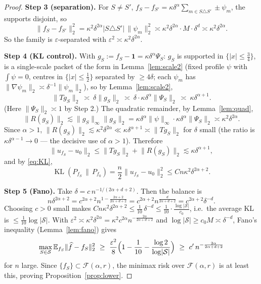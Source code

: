 \documentclass[11pt]{article}
\theoremstyle{remark}
\newcommand{\E}{\mathbb{E}}
\newcommand{\F}{\mathcal{F}}
\newcommand{\one}{\mathbf{1}}
\newcommand{\norm}[1]{\lVert #1\rVert}
\newcommand{\abs}[1]{\lvert #1\rvert}
\newcommand{\SET}[1]{\{#1\}}
\begin{document}
\begin{proof}
\textbf{Step 3 (separation).} For $S\ne S'$,
$f_S-f_{S'}=\kappa\delta^{\alpha}\sum_{m\in S\triangle S'}\pm\psi_m$, the
supports disjoint, so
\[
\norm{f_S-f_{S'}}_2^{2}
=\kappa^{2}\delta^{2\alpha}\abs{S\triangle S'}\,\norm{\psi_m}_2^{2}
\asymp\kappa^{2}\delta^{2\alpha}\cdot M\cdot\delta^{d}
\asymp\kappa^{2}\delta^{2\alpha}.
\]
So the family is $\varepsilon$-separated with
$\varepsilon^{2}\asymp\kappa^{2}\delta^{2\alpha}$.

\textbf{Step 4 (KL control).} With $g_S:=f_S-\one=\kappa\delta^{\alpha}\Psi_S$:
$g_S$ is supported in $\SET{\abs x\le\tfrac34}$, is a single-scale packet
of the form in Lemma~\ref{lem:scale2} (fixed profile $\psi$ with
$\int\psi=0$, centres in $\SET{\abs x\le\tfrac12}$ separated by
$\ge4\delta$; each $\psi_m$ has
$\norm{\nabla\psi_m}_2\asymp\delta^{-1}\norm{\psi_m}_2$), so by
Lemma~\ref{lem:scale2},
\[
\norm{Tg_S}_2\ \asymp\ \delta\norm{g_S}_2
\ \asymp\ \delta\cdot\kappa\delta^{\alpha}\norm{\Psi_S}_2
\ \asymp\ \kappa\delta^{\alpha+1}.
\]
(Here $\norm{\Psi_S}_2\asymp1$ by Step 2.) The quadratic remainder, by
Lemma~\ref{lem:quad},
\[
\norm{R(g_S)}_2\lesssim\norm{g_S}_\infty\norm{g_S}_2
=\kappa\delta^{\alpha}\norm{\psi}_\infty\cdot\kappa\delta^{\alpha}\norm{\Psi_S}_2
\asymp\kappa^{2}\delta^{2\alpha}.
\]
Since $\alpha>1$, $\norm{R(g_S)}_2\lesssim\kappa^{2}\delta^{2\alpha}
\ll\kappa\delta^{\alpha+1}\asymp\norm{Tg_S}_2$ for $\delta$ small (the
ratio is $\kappa\delta^{\alpha-1}\to0$ --- the decisive use of $\alpha>1$).
Therefore
\[
\norm{u_{f_S}-u_0}_2
\le\norm{Tg_S}_2+\norm{R(g_S)}_2
\lesssim\kappa\delta^{\alpha+1},
\]
and by \eqref{eq:KL},
\begin{equation}\label{eq:KLbound}
\operatorname{KL}(P_{f_S}\,\|\,P_{f_0})
=\frac{n}{2}\norm{u_{f_S}-u_0}_2^{2}
\le Cn\kappa^{2}\delta^{2\alpha+2}.
\end{equation}

\textbf{Step 5 (Fano).} Take
$\delta=c\,n^{-1/(2\alpha+d+2)}$. Then the balance is
\[
n\delta^{2\alpha+2}=c^{2\alpha+2}n^{1-\frac{2\alpha+2}{2\alpha+d+2}}
=c^{2\alpha+2}n^{\frac{d}{2\alpha+d+2}}
=c^{2\alpha+2}\delta^{-d}.
\]
Choosing $c>0$ small makes $Cn\kappa^{2}\delta^{2\alpha+2}
\le\frac1{10}\,\delta^{-d}\le\frac1{10}\cdot\frac{\log\abs{\mathcal S}}{c_0}$,
i.e.\ the average KL is $\le\frac1{10}\log\abs{\mathcal S}$. With
$\varepsilon^{2}\asymp\kappa^{2}\delta^{2\alpha}
=\kappa^{2}c^{2\alpha}n^{-\frac{2\alpha}{2\alpha+d+2}}$ and
$\log\abs{\mathcal S}\ge c_0M\asymp\delta^{-d}$, Fano's inequality
(Lemma~\ref{lem:fano}) gives
\[
\max_{S\in\mathcal S}\E_{f_S}\norm{\widehat f-f_S}_2^{2}
\ \ge\ \frac{\varepsilon^{2}}{8}\Bigl(1-\frac1{10}-\frac{\log2}{\log\abs{\mathcal S}}\Bigr)
\ \ge\ c'\,n^{-\frac{2\alpha}{2\alpha+d+2}}
\]
for $n$ large. Since $\SET{f_S}\subset\F(\alpha,r)$, the minimax risk over
$\F(\alpha,r)$ is at least this, proving Proposition~\ref{prop:lower}.
\end{proof}
\end{document}
